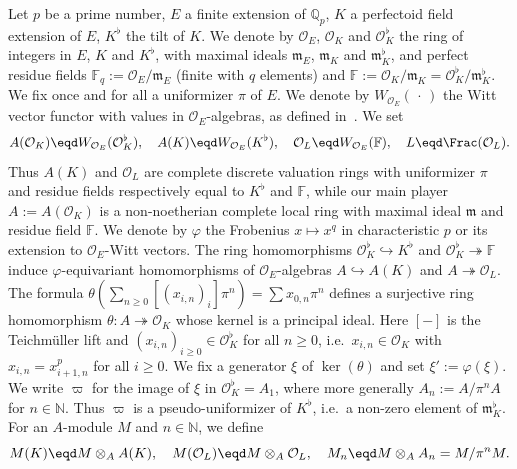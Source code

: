 Let $p$ be a prime number, $E$ a finite extension of $\mathbb{Q}_{p}$, $K$ a perfectoid field extension of $E$, $K^{\flat}$ the tilt of $K$. We denote by $\mathcal{O}_{E}$, $\mathcal{O}_{K}$ and $\mathcal{O}_{K}^{\flat}$ the ring of integers in $E$, $K$ and $K^{\flat}$, with maximal ideals $\mathfrak{m}_{E}$, $\mathfrak{m}_{K}$ and $\mathfrak{m}_{K}^{\flat}$, and perfect residue fields $\mathbb{F}_{q}:=\mathcal{O}_{E}/\mathfrak{m}_{E}$ (finite with $q$ elements) and $\mathbb{F}:=\mathcal{O}_{K}/\mathfrak{m}_{K}=\mathcal{O}_{K}^{\flat}/\mathfrak{m}_{K}^{\flat}$. We fix once and for all a uniformizer $\pi$ of $E$. We denote by $W_{\mathcal{O}_{E}}({\,\cdot\,})$ the Witt vector functor with values in $\mathcal{O}_{E}$-algebras, as defined in~\cite[1.2]{FaFo15}. We set
\[
A(\mathcal{O}_{K})\eqd W_{\mathcal{O}_{E}}(\mathcal{O}_{K}^{\flat}),\quad A(K)\eqd W_{\mathcal{O}_{E}}(K^{\flat}),\quad\mathcal{O}_{L}\eqd W_{\mathcal{O}_{E}}(\mathbb{F}),\quad L\eqd\Frac(\mathcal{O}_{L}).
\]
Thus $A(K)$ and $\mathcal{O}_{L}$ are complete discrete valuation rings with uniformizer $\pi$ and residue fields respectively equal to $K^{\flat}$ and $\mathbb{F}$, while our main player $A:=A(\mathcal{O}_{K})$ is a non-noetherian complete local ring with maximal ideal $\mathfrak{m}$ and residue field $\mathbb{F}$. We denote by $\varphi$ the Frobenius $x\mapsto x^{q}$ in characteristic $p$ or its extension to $\mathcal{O}_{E}$-Witt vectors. The ring homomorphisms $\mathcal{O}_{K}^{\flat}\hookrightarrow K^{\flat}$ and $\mathcal{O}_{K}^{\flat}\twoheadrightarrow\mathbb{F}$ induce $\varphi$-equivariant homomorphisms of $\mathcal{O}_{E}$-algebras $A\hookrightarrow A(K)$ and $A\twoheadrightarrow\mathcal{O}_{L}$. The formula $\theta(\sum_{n\geq0}[(x_{i,n})_{i}]\pi^{n})=\sum x_{0,n}\pi^{n}$ defines a surjective ring homomorphism $\theta:A\twoheadrightarrow\mathcal{O}_{K}$ whose kernel is a principal ideal. Here $[-]$ is the Teichm\"uller lift and $(x_{i,n})_{i\geq0}\in\mathcal{O}_{K}^{\flat}$ for all $n\geq0$, i.e.~$x_{i,n}\in\mathcal{O}_{K}$ with $x_{i,n}=x_{i+1,n}^{p}$ for all $i\geq0$. We fix a generator $\xi$ of $\ker(\theta)$ and set $\xi':=\varphi(\xi)$. We write $\varpi$ for the image of $\xi$ in $\mathcal{O}_{K}^{\flat}=A_{1}$, where more generally $A_{n}:=A/\pi^{n}A$ for $n\in\mathbb{N}$. Thus $\varpi$ is a pseudo-uniformizer of $K^{\flat}$, i.e.~a non-zero element of $\mathfrak{m}_{K}^{\flat}$. For an $A$-module $M$ and $n\in\mathbb{N}$, we define\emph{ }
\[
M(K)\eqd M\otimes_{A}A(K),\quad M(\mathcal{O}_{L})\eqd M\otimes_{A}\mathcal{O}_{L},\quad M_{n}\eqd M\otimes_{A}A_{n}=M/\pi^{n}M.
\]

